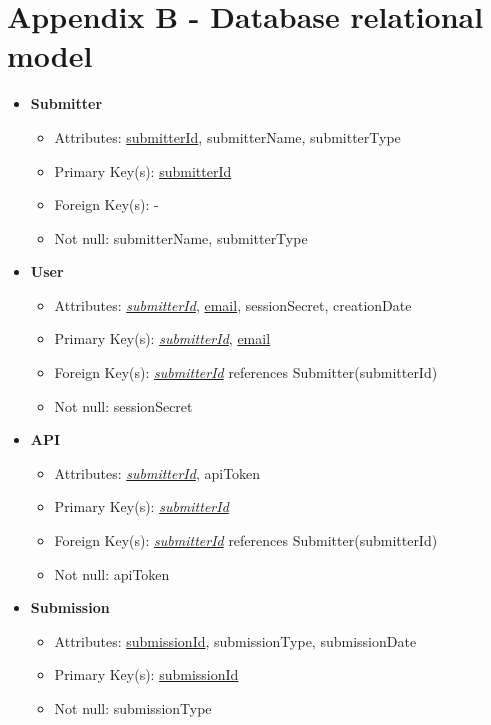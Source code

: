 \section*{Appendix B - Database relational model}
\label{app:relational_model}
    \begin{itemize}
        \item \textbf{Submitter}        
        \begin{itemize}
            \item Attributes: \underline{submitterId}, submitterName, submitterType
            \item Primary Key(s): \underline{submitterId}
            \item Foreign Key(s): -
            \item Not null: submitterName, submitterType
        \end{itemize}

        \item \textbf{User}
        \begin{itemize}
            \item Attributes: \underline{\textit{submitterId}}, \underline{email}, sessionSecret, creationDate
            \item Primary Key(s): \underline{\textit{submitterId}}, \underline{email}
            \item Foreign Key(s): \underline{\textit{submitterId}} references Submitter(submitterId)
            \item Not null: sessionSecret
        \end{itemize}

        \item \textbf{API}
        \begin{itemize}
            \item Attributes: \underline{\textit{submitterId}}, apiToken
            \item Primary Key(s): \underline{\textit{submitterId}}
            \item Foreign Key(s): \underline{\textit{submitterId}} references Submitter(submitterId)
            \item Not null: apiToken
        \end{itemize}

        \item \textbf{Submission}
        \begin{itemize}
            \item Attributes: \underline{submissionId}, submissionType, submissionDate
            \item Primary Key(s): \underline{submissionId}            
            \item Not null: submissionType
        \end{itemize}


\end{itemize}
